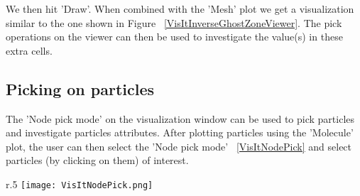 
We then hit 'Draw'. When combined with the 'Mesh' plot we get a visualization similar to the one shown in Figure ~\ref{VisItInverseGhostZoneViewer}. The pick operations on the viewer can then be used to investigate the value(s) in these extra cells. 


\begin{figure}[h]
  \centering
 \vspace{5pt}
  \hspace{20pt}
 \hspace{20pt}
  \caption{}
 \vspace{-10pt}
  \label{}
\end{figure}


\subsection{Picking on particles}

The 'Node pick mode' on the visualization window can be used to pick
particles and investigate particles attributes. After plotting
particles using the 'Molecule' plot, the user can then select the
'Node pick mode' ~\ref{VisItNodePick} and select particles (by
clicking on them) of interest.

 \begin{wrapfigure}{r}{.5\textwidth}
   \center
   \texttt{[image: VisItNodePick.png]}
   \caption{The 'Node pick mode' on the visualization window}
   \label{VisItNodePick}
 \end{wrapfigure}

